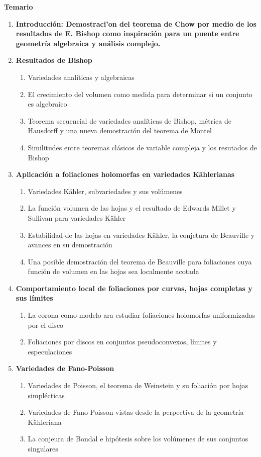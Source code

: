 \documentclass[letterpaper]{report}
\begin{document}
\noindent\Huge{\textbf{Temario}}
\normalsize
\vspace{0.5cm}
\begin{enumerate}
\item\textbf{Introducci\'on: Demostraci'on del teorema de Chow por medio de los resultados de E. Bishop como inspiraci\'on para un puente entre geometr\'ia algebraica y an\'alisis complejo.}
\item\textbf{Resultados de Bishop}
    \begin{enumerate}
        \item Variedades anal\'iticas y algebraicas
        \item El crecimiento del volumen como medida para determinar si un conjunto es algebraico
        \item Teorema secuencial de variedades anal\'iticas de Bishop, m\'etrica de Hausdorff y una nueva demostraci\'on del teorema de Montel
        \item Similitudes entre teoremas cl\'asicos de variable compleja y los resutados de Bishop
    \end{enumerate}
\item\textbf{Aplicaci\'on a foliaciones holomorfas en variedades K\"ahlerianas}
    \begin{enumerate}
        \item Variedades K\"ahler, subvariedades y sus vol\'umenes
        \item La funci\'on volumen de las hojas y el resultado de Edwards Millet y Sullivan para variedades K\"ahler
        \item Estabilidad de las hojas en variedades K\"ahler, la conjetura de Beauville y avances en su demostraci\'on
        \item Una posible demostraci\'on del teorema de Beauville para foliaciones cuya funci\'on de volumen en las hojas sea localmente acotada
    \end{enumerate}
\item\textbf{Comportamiento local de foliaciones por curvas, hojas completas y sus l\'imites}
    \begin{enumerate}
        \item La corona como modelo ara estudiar foliaciones holomorfas uniformizadas por el disco
        \item Foliaciones por discos en conjuntos pseudoconvexos, l\'imites y especulaciones
    \end{enumerate}
\item\textbf{Variedades de Fano-Poisson}
    \begin{enumerate}
        \item Variedades de Poisson, el teorema de Weinstein y su foliaci\'on por hojas simpl\'ecticas
        \item Variedades de Fano-Poisson vistas desde la perpectiva de la geometr\'ia K\"ahleriana
        \item La conjeura de Bondal e hip\'otesis sobre los vol\'umenes de sus conjuntos singulares
    \end{enumerate}
\end{enumerate}
\end{document}
